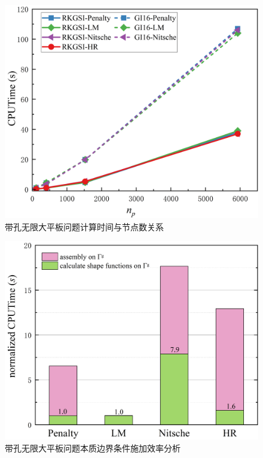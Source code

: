 % 
\begin{figure}[H]
    \centering
    \includegraphics[scale=0.5]{figure/E/hole/CPUTime.png}
    \caption{带孔无限大平板问题计算时间与节点数关系}\label{HCPUTime}
\end{figure}
\begin{figure}[H]
    \centering
    \includegraphics[scale=0.5]{figure/E/hole/caculate.png}
    \caption{带孔无限大平板问题本质边界条件施加效率分析}\label{Hcaculate}
\end{figure}
